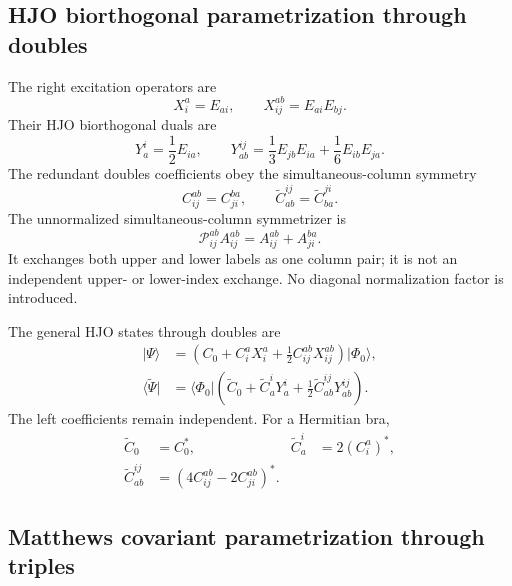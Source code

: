 \documentclass[10pt]{article}
\numberwithin{equation}{section}
\newcommand{\vac}{\Phi_0}
\newcommand{\tC}{\widetilde{C}}
\newcommand{\tPsi}{\widetilde{\Psi}}
\begin{document}
\subsection{HJO biorthogonal parametrization through doubles}

The right excitation operators are
\begin{equation}
 X_i^a=E_{ai},
 \qquad
 X_{ij}^{ab}=E_{ai}E_{bj}.
\end{equation}
Their HJO biorthogonal duals are
\begin{equation}
 Y_a^i=\frac12E_{ia},
 \qquad
 Y_{ab}^{ij}=\frac13E_{jb}E_{ia}+\frac16E_{ib}E_{ja}.
\end{equation}
The redundant doubles coefficients obey the simultaneous-column symmetry
\begin{equation}
 C_{ij}^{ab}=C_{ji}^{ba},
 \qquad
 \tC_{ab}^{ij}=\tC_{ba}^{ji}.
\end{equation}
The unnormalized simultaneous-column symmetrizer is
\begin{equation}
 \mathcal P_{ij}^{ab}A_{ij}^{ab}
 =A_{ij}^{ab}+A_{ji}^{ba}.
\end{equation}
It exchanges both upper and lower labels as one column pair; it is not an
independent upper- or lower-index exchange.  No diagonal normalization factor
is introduced.

The general HJO states through doubles are
\begin{align}
 \lvert\Psi\rangle
 &=\left(C_0+C_i^aX_i^a+\frac12C_{ij}^{ab}X_{ij}^{ab}\right)
   \lvert\vac\rangle,
 \\
 \langle\tPsi\rvert
 &=\langle\vac\rvert\left(
   \tC_0+\tC_a^iY_a^i+\frac12\tC_{ab}^{ij}Y_{ab}^{ij}
   \right).
\end{align}
The left coefficients remain independent.  For a Hermitian bra,
\begin{align}
 \tC_0&=C_0^{*},
 &
 \tC_a^i&=2(C_i^a)^{*},
 \\
 \tC_{ab}^{ij}
 &=\left(4C_{ij}^{ab}-2C_{ji}^{ab}\right)^{*}.
\end{align}

\subsection{Matthews covariant parametrization through triples}
\label{sec:matthews-cisdt-state}
\end{document}
